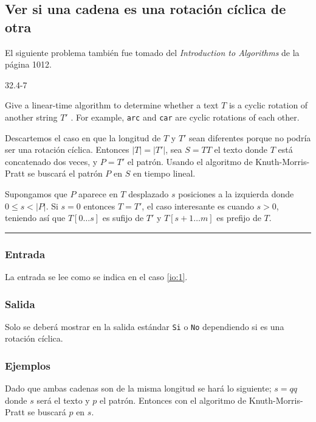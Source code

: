 \newpage


\subsection{Ver si una cadena es una rotación cíclica de otra}
El siguiente problema también fue tomado del \emph{Introduction to 
Algorithms}\cite{cormen_2009}
de la página 1012.
\begin{tcolorbox}
\hypertarget{cyclic_rotation}{32.4-7}
Give a linear-time algorithm to determine whether a text $T$ is a cyclic rotation of another string
$T'$ . For example, \texttt{arc} and \texttt{car} are cyclic rotations of each other.
\end{tcolorbox}

Descartemos el caso en que la longitud de $T$ y $T'$ sean diferentes porque no podría ser una
rotación cíclica. Entonces $\vert T \vert = \vert T' \vert$, sea $S = TT$ el texto donde $T$ está
concatenado dos veces, y $P = T'$ el patrón. Usando el algoritmo de Knuth-Morris-Pratt se buscará
el patrón $P$ en $S$ en tiempo lineal.

Supongamos que $P$ aparece en $T$ desplazado $s$ posiciones a la izquierda donde
$0 \leq s < \vert P \vert$. Si $s = 0$ entonces $T = T'$, el caso interesante es cuando $s > 0$,
teniendo así que $T[0 \ldots s]$ es sufijo de $T'$ y $T[s+1 \ldots m]$ es prefijo de $T$. 

\noindent\rule{\textwidth}{1pt}

\subsubsection{Entrada}
La entrada se lee como se indica en el caso \ref{io:1}.

\subsubsection{Salida}
Solo se deberá mostrar en la salida estándar \texttt{Si} o \texttt{No} dependiendo si es una
rotación cíclica.

\subsubsection{Ejemplos}
Dado que ambas cadenas son de la misma longitud se hará lo siguiente; $s = qq$ donde $s$ será el
texto y $p$ el patrón. Entonces con el algoritmo de Knuth-Morris-Pratt se 
buscará $p$ en $s$.

